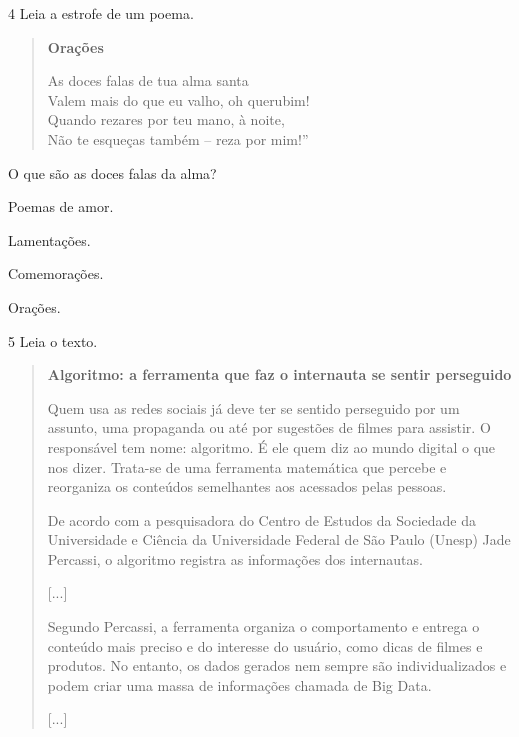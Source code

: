 
\pagebreak
\num{4} Leia a estrofe de um poema.

\begin{verse}
\textbf{Orações}

As doces falas de tua alma santa\\
Valem mais do que eu valho, oh querubim!\\
Quando rezares por teu mano, à noite,\\
Não te esqueças também – reza por mim!”

\end{verse}

O que são as doces falas da alma?

\begin{minipage}{.5\textwidth}
\begin{escolha}
\item Poemas de amor.

\item Lamentações.

\item Comemorações.

\item Orações.
\end{escolha}
\end{minipage}

\num{5} Leia o texto.

\begin{quote}
\textbf{Algoritmo: a ferramenta que faz o internauta se sentir perseguido}

Quem usa as redes sociais já deve ter se sentido perseguido por um assunto, uma propaganda ou até por sugestões de filmes para assistir. O responsável tem nome: algoritmo. É ele quem diz ao mundo digital o que nos dizer. Trata-se de uma ferramenta matemática que percebe e reorganiza os conteúdos semelhantes aos acessados pelas pessoas.

De acordo com a pesquisadora do Centro de Estudos da Sociedade da Universidade e Ciência da Universidade Federal de São Paulo (Unesp) Jade Percassi, o algoritmo registra as informações dos internautas.

{[}...{]}

Segundo Percassi, a ferramenta organiza o comportamento e entrega o conteúdo mais preciso e do interesse do usuário, como dicas de filmes e produtos. No entanto, os dados gerados nem sempre são individualizados e podem criar uma massa de informações chamada de Big Data.

{[}...{]}
\end{quote}

